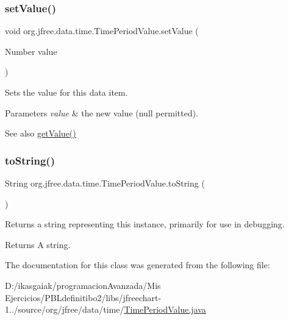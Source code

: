\subsubsection{\texorpdfstring{set\+Value()}{setValue()}}
{\footnotesize\ttfamily void org.\+jfree.\+data.\+time.\+Time\+Period\+Value.\+set\+Value (\begin{DoxyParamCaption}\item[{Number}]{value }\end{DoxyParamCaption})}

Sets the value for this data item.


\begin{DoxyParams}{Parameters}
{\em value} & the new value ({\ttfamily null} permitted).\\
\hline
\end{DoxyParams}
\begin{DoxySeeAlso}{See also}
\mbox{\hyperlink{classorg_1_1jfree_1_1data_1_1time_1_1_time_period_value_a8477b0ff36ad1cc849c4c9e551c2037d}{get\+Value()}} 
\end{DoxySeeAlso}
\mbox{\label{classorg_1_1jfree_1_1data_1_1time_1_1_time_period_value_ab5c2a219be15dd426f8b689a78f2e882}} 
\subsubsection{\texorpdfstring{to\+String()}{toString()}}
{\footnotesize\ttfamily String org.\+jfree.\+data.\+time.\+Time\+Period\+Value.\+to\+String (\begin{DoxyParamCaption}{ }\end{DoxyParamCaption})}

Returns a string representing this instance, primarily for use in debugging.

\begin{DoxyReturn}{Returns}
A string. 
\end{DoxyReturn}


The documentation for this class was generated from the following file\+:\begin{DoxyCompactItemize}
\item 
D\+:/ikasgaiak/programacion\+Avanzada/\+Mis Ejercicios/\+P\+B\+Ldefinitibo2/libs/jfreechart-\/1../source/org/jfree/data/time/\mbox{\hyperlink{_time_period_value_8java}{Time\+Period\+Value.\+java}}\end{DoxyCompactItemize}
